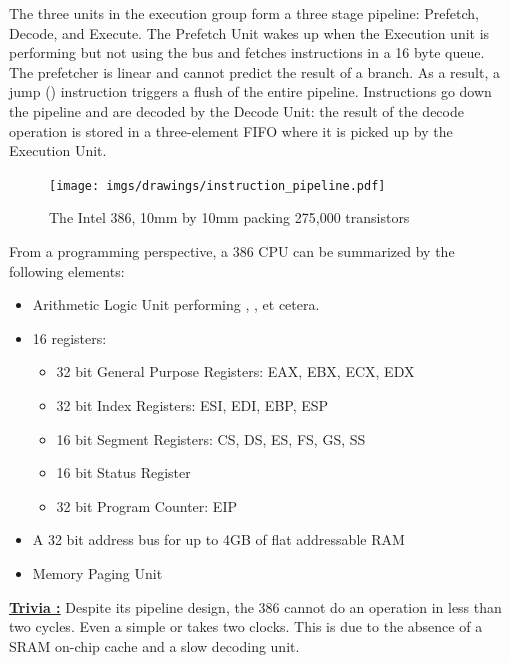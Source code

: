 \documentclass[book.tex]{subfiles}
\begin{document}
\par
The three units in the execution group form a three stage pipeline: Prefetch, Decode, and Execute. The Prefetch Unit wakes up when the Execution unit is performing but not using the bus and fetches instructions in a 16 byte queue. The prefetcher is linear and cannot predict the result of a branch. As a result, a jump () instruction triggers a flush of the entire pipeline. Instructions go down the pipeline and are decoded by the Decode Unit: the result of the decode operation is stored in a three-element FIFO where it is picked up by the Execution Unit.\\
\par

\begin{figure}[H]
\centering
\texttt{[image: imgs/drawings/instruction\_pipeline.pdf]}\\
\end{figure}
\par
\begin{figure}[H]
\centering

\caption{The Intel 386, 10mm by 10mm packing 275,000 transistors}
\end{figure}
\par
From a programming perspective, a 386 CPU can be summarized by the following elements:
\begin{itemize}
\item Arithmetic Logic Unit performing , ,  et cetera.
\item 16 registers:
\begin{itemize}
  \item 32 bit General Purpose Registers: EAX, EBX, ECX, EDX
  \item 32 bit Index Registers: ESI, EDI, EBP, ESP
  \item 16 bit Segment Registers: CS, DS, ES, FS, GS, SS
  \item 16 bit Status Register
  \item 32 bit Program Counter: EIP
\end{itemize}
\item A 32 bit address bus for up to 4GB of flat addressable RAM
\item Memory Paging Unit
\end{itemize}
 \par
 \textbf{\underline{Trivia :}} Despite its pipeline design, the 386 cannot do an operation in less than two cycles. Even a simple  or  takes two clocks. This is due to the absence of a SRAM on-chip cache and a slow decoding unit.\\
 \par
 
\end{document}
